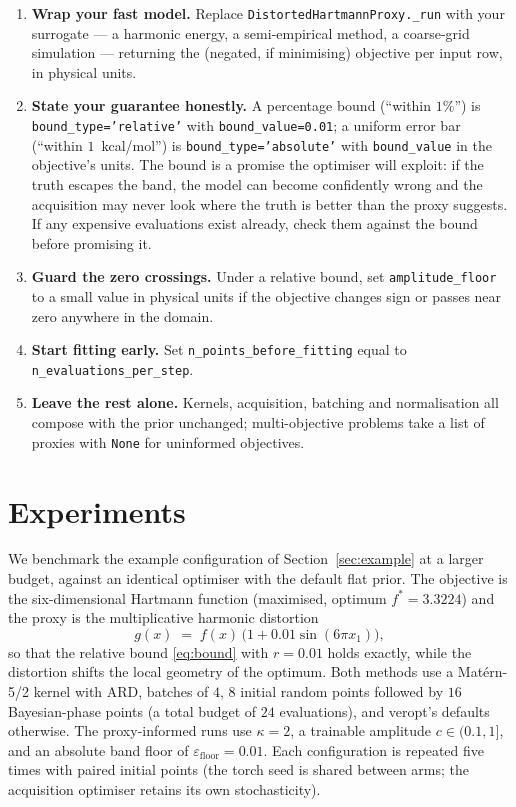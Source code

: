 \documentclass[11pt,a4paper]{article}
\newcommand{\veropt}{\textsf{veropt}}
\newcommand{\code}[1]{\texttt{#1}}
\begin{document}
\begin{enumerate}
  \item \textbf{Wrap your fast model.} Replace
    \code{DistortedHartmannProxy.\_run} with your surrogate --- a harmonic
    energy, a semi-empirical method, a coarse-grid simulation --- returning
    the (negated, if minimising) objective per input row, in physical units.
  \item \textbf{State your guarantee honestly.} A percentage bound
    (``within $1\%$'') is \code{bound\_type='relative'} with
    \code{bound\_value=0.01}; a uniform error bar (``within
    $1$~kcal/mol'') is \code{bound\_type='absolute'} with
    \code{bound\_value} in the objective's units. The bound is a promise the
    optimiser will exploit: if the truth escapes the band, the model can
    become confidently wrong and the acquisition may never look where the
    truth is better than the proxy suggests. If any expensive evaluations
    exist already, check them against the bound before promising it.
  \item \textbf{Guard the zero crossings.} Under a relative bound, set
    \code{amplitude\_floor} to a small value in physical units if the
    objective changes sign or passes near zero anywhere in the domain.
  \item \textbf{Start fitting early.} Set
    \code{n\_points\_before\_fitting} equal to
    \code{n\_evaluations\_per\_step}.
  \item \textbf{Leave the rest alone.} Kernels, acquisition, batching and
    normalisation all compose with the prior unchanged; multi-objective
    problems take a list of proxies with \code{None} for uninformed
    objectives.
\end{enumerate}

\section{Experiments}
\label{sec:experiments}

We benchmark the example configuration of Section~\ref{sec:example} at a
larger budget, against an identical optimiser with the default flat prior.
The objective is the six-dimensional Hartmann function (maximised, optimum
$f^* = 3.3224$) and the proxy is the multiplicative harmonic distortion
\begin{equation}
  g(x) \;=\; f(x)\,\bigl(1 + 0.01 \sin(6\pi x_1)\bigr),
\end{equation}
so that the relative bound \eqref{eq:bound} with $r = 0.01$ holds exactly,
while the distortion shifts the local geometry of the optimum. Both methods
use a Mat\'ern-5/2 kernel with ARD, batches of $4$, $8$ initial random points
followed by $16$ Bayesian-phase points (a total budget of $24$ evaluations),
and \veropt{}'s defaults otherwise. The proxy-informed runs use $\kappa = 2$,
a trainable amplitude $c \in (0.1, 1]$, and an absolute band floor of
$\varepsilon_{\mathrm{floor}} = 0.01$. Each configuration is repeated five
times with paired initial points (the torch seed is shared between arms; the
acquisition optimiser retains its own stochasticity).
\end{document}
